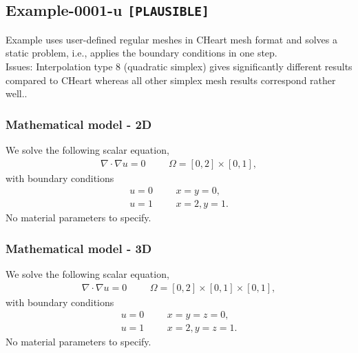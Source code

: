 %
\clearpage
%
\subsection{Example-0001-u \texttt{[PLAUSIBLE]}}
%
Example uses user-defined regular meshes in CHeart mesh format
and solves a static problem, i.e., applies the boundary conditions in one step.\\[3ex]

Issues: Interpolation type 8 (quadratic simplex) gives significantly different
results compared to CHeart whereas all other simplex mesh results correspond
rather well..
%
%
\subsubsection{Mathematical model - 2D}
%
We solve the following scalar equation,
%
\begin{align}
    \nabla \cdot \nabla u = 0 & &&\Omega = [0, 2] \times [0, 1],
\end{align}
%
with boundary conditions
%
\begin{align}
    u = 0 & &&x = y = 0, \\
    u = 1 & &&x = 2, y = 1.
\end{align}
%
No material parameters to specify.
%
%
\subsubsection{Mathematical model - 3D}
%
We solve the following scalar equation,
%
\begin{align}
    \nabla \cdot \nabla u = 0 & &&\Omega = [0, 2] \times [0, 1] \times [0, 1],
\end{align}
%
with boundary conditions
%
\begin{align}
    u = 0 & &&x = y = z = 0, \\
    u = 1 & &&x = 2, y = z = 1.
\end{align}
%
No material parameters to specify.
%
%

